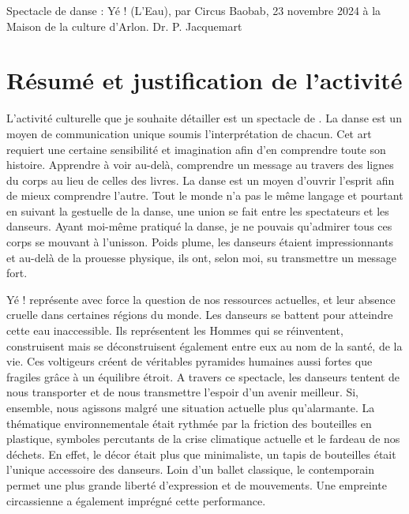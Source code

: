 Spectacle de danse : Yé ! (L’Eau), par Circus Baobab, 23 novembre 2024 à la Maison de la culture d’Arlon. 
Dr. P. Jacquemart

\section{Résumé et justification de l'activité}


L’activité culturelle que je souhaite détailler est un spectacle de  \parencite{circusbaobab_site}. La danse est un moyen de communication unique soumis l’interprétation de chacun. Cet art requiert une certaine sensibilité et imagination afin d’en comprendre toute son histoire. Apprendre à voir au-delà, comprendre un message au travers des lignes du corps au lieu de celles des livres. La danse est un moyen d’ouvrir l’esprit afin de mieux comprendre l’autre. Tout le monde n’a pas le même langage et pourtant en suivant la gestuelle de la danse, une union se fait entre les spectateurs et les danseurs.  Ayant moi-même pratiqué la danse, je ne pouvais qu’admirer tous ces corps se mouvant à l'unisson. Poids plume, les danseurs étaient impressionnants et au-delà de la prouesse physique, ils ont, selon moi, su transmettre un message fort.
 
Yé ! représente avec force la question de nos ressources actuelles, et leur absence cruelle dans certaines régions du monde. Les danseurs se battent pour atteindre cette eau inaccessible. Ils représentent les Hommes qui se réinventent, construisent mais se déconstruisent également entre eux au nom de la santé, de la vie. Ces voltigeurs créent de véritables pyramides humaines aussi fortes que fragiles grâce à un équilibre étroit. A travers ce spectacle, les danseurs tentent de nous transporter et de nous transmettre l’espoir d’un avenir meilleur. Si, ensemble, nous agissons malgré une situation actuelle plus qu’alarmante. La thématique environnementale était rythmée par la friction des bouteilles en plastique, symboles percutants de la crise climatique actuelle et le fardeau de nos déchets. En effet, le décor était plus que minimaliste, un tapis de bouteilles était l’unique accessoire des danseurs. Loin d’un ballet classique, le contemporain permet une plus grande liberté d’expression et de mouvements. Une empreinte circassienne a également imprégné cette performance.
 
